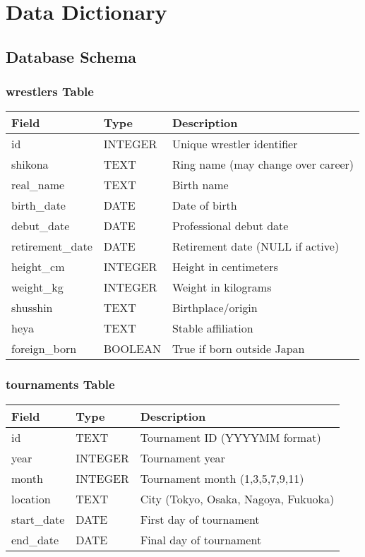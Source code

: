 \chapter{Data Dictionary}

\section{Database Schema}

\subsection{wrestlers Table}
\begin{longtable}{llp{7cm}}
\toprule
Field & Type & Description \\
\midrule
\endhead
id & INTEGER & Unique wrestler identifier \\
shikona & TEXT & Ring name (may change over career) \\
real\_name & TEXT & Birth name \\
birth\_date & DATE & Date of birth \\
debut\_date & DATE & Professional debut date \\
retirement\_date & DATE & Retirement date (NULL if active) \\
height\_cm & INTEGER & Height in centimeters \\
weight\_kg & INTEGER & Weight in kilograms \\
shusshin & TEXT & Birthplace/origin \\
heya & TEXT & Stable affiliation \\
foreign\_born & BOOLEAN & True if born outside Japan \\
\bottomrule
\end{longtable}

\subsection{tournaments Table}
\begin{longtable}{llp{7cm}}
\toprule
Field & Type & Description \\
\midrule
\endhead
id & TEXT & Tournament ID (YYYYMM format) \\
year & INTEGER & Tournament year \\
month & INTEGER & Tournament month (1,3,5,7,9,11) \\
location & TEXT & City (Tokyo, Osaka, Nagoya, Fukuoka) \\
start\_date & DATE & First day of tournament \\
end\_date & DATE & Final day of tournament \\
\bottomrule
\end{longtable}

